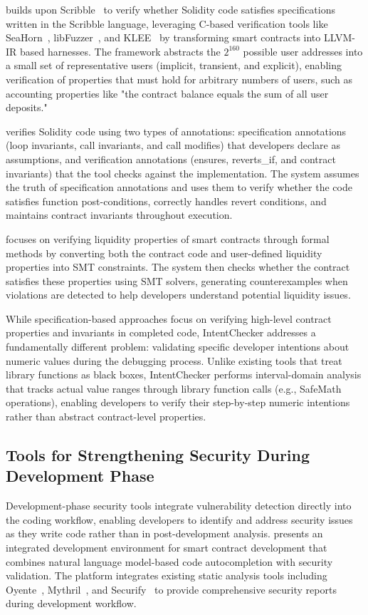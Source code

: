 \documentclass[pdflatex,sn-basic]{sn-jnl}%
\theoremstyle{thmstyleone}%
\theoremstyle{thmstyletwo}%
\theoremstyle{thmstylethree}%
\begin{document}
\citep{smartace} builds upon Scribble~\citep{scribble} to verify whether Solidity code satisfies specifications written in the Scribble language,
leveraging C-based verification tools like SeaHorn~\citep{seahorn}, libFuzzer~\citep{libfuzzer}, and KLEE~\citep{klee} by transforming smart contracts into LLVM-IR based harnesses.
The framework abstracts the $2^{160}$ possible user addresses into a small set of representative users (implicit, transient, and explicit),
enabling verification of properties that must hold for arbitrary numbers of users, such as accounting properties like
"the contract balance equals the sum of all user deposits."

\citep{idealist} verifies Solidity code using two types of annotations: specification annotations (loop invariants, call invariants, and call modifies) that developers declare as assumptions,
and verification annotations (ensures, reverts\_if, and contract invariants) that the tool checks against the implementation.
The system assumes the truth of specification annotations and uses them to verify whether the code satisfies function post-conditions,
correctly handles revert conditions, and maintains contract invariants throughout execution.

\citep{solvent} focuses on verifying liquidity properties of smart contracts through formal methods
by converting both the contract code and user-defined liquidity properties into SMT constraints.
The system then checks whether the contract satisfies these properties using SMT solvers,
generating counterexamples when violations are detected to help developers understand potential liquidity issues.


While specification-based approaches focus on verifying high-level contract properties and invariants in completed code,
IntentChecker addresses a fundamentally different problem: validating specific developer intentions about numeric values during the debugging process.
Unlike existing tools that treat library functions as black boxes, IntentChecker performs interval-domain analysis
that tracks actual value ranges through library function calls (e.g., SafeMath operations),
enabling developers to verify their step-by-step numeric intentions rather than abstract contract-level properties.

\subsection{Tools for Strengthening Security During Development Phase}
Development-phase security tools integrate vulnerability detection directly into the coding workflow, enabling developers to identify and address security issues as they write code rather than in post-development analysis.
\citep{making} presents an integrated development environment for smart contract development that combines natural language model-based code autocompletion with security validation.
The platform integrates existing static analysis tools including Oyente~\citep{oyente}, Mythril~\citep{mythril}, and Securify~\citep{securify} to provide comprehensive security reports during development workflow.
\end{document}
